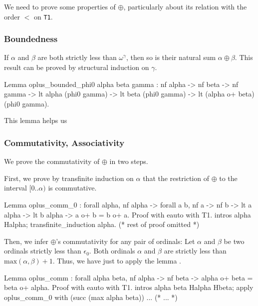 We need to prove some properties of $\oplus$, particularly about 
its relation with the order $<$ on \texttt{T1}.

\subsubsection{Boundedness}
If $\alpha$ and $\beta$ are both strictly  less than  $\omega^\gamma$, then so is their natural sum
$\alpha \oplus \beta$. This result can be proved by structural induction on $\gamma$.


\begin{Coqsrc}
Lemma oplus_bounded_phi0 alpha beta gamma :
  nf alpha -> nf beta -> nf gamma ->
  lt alpha (phi0 gamma) ->
  lt beta (phi0 gamma) ->
  lt (alpha o+ beta) (phi0 gamma).
\end{Coqsrc}

This lemma helps us 

\subsubsection{Commutativity, Associativity}

We prove  the commutativity of $\oplus$ in two steps. 

First, we prove by transfinite induction on $\alpha$ that the restriction of $\oplus$ to the
interval $[0..\alpha)$ is commutative.


\begin{Coqsrc}
Lemma oplus_comm_0 : forall alpha, nf alpha ->
     forall a b,  nf a -> nf b ->
                  lt a alpha ->
                  lt b alpha ->
                  a o+ b = b o+ a.
 Proof with eauto with T1.
    intros alpha Halpha; transfinite_induction alpha.
(* rest of proof omitted *)  
\end{Coqsrc}

Then, we infer  $\oplus$'s commutativity for any pair of ordinals:
Let $\alpha$ and $\beta$ be two ordinals strictly less than $\epsilon_0$. Both ordinals $\alpha$ and $\beta$ are
strictly less than $\textrm{max}(\alpha,\beta)+1$.
    Thus, we have just to apply the lemma .

\begin{Coqsrc}
  Lemma oplus_comm : forall alpha beta, 
      nf alpha -> nf beta ->
      alpha o+ beta =  beta o+ alpha.
  Proof with eauto with T1.
    intros alpha beta Halpha Hbeta;
    apply oplus_comm_0 with (succ (max alpha beta)) ...  
  (* ... *)
\end{Coqsrc}

